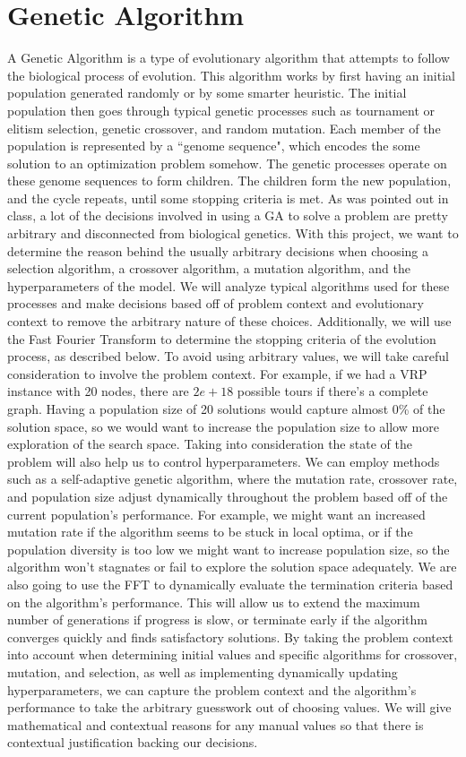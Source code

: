 \documentclass{article}
\renewcommand{\_}{\ifincsname_\else\legacyunderscore\fi}
\begin{document}
\section*{Genetic Algorithm}
A Genetic Algorithm is a type of evolutionary algorithm that attempts to follow the biological process of evolution. This algorithm works by first having an initial population generated randomly or by some smarter heuristic. The initial population then goes through typical genetic processes such as tournament or elitism selection, genetic crossover, and random mutation. Each member of the population is represented by a ``genome sequence", which encodes the some solution to an optimization problem somehow. The genetic processes operate on these genome sequences to form children. The children form the new population, and the cycle repeats, until some stopping criteria is met. As was pointed out in class, a lot of the decisions involved in using a GA to solve a problem are pretty arbitrary and disconnected from biological genetics. With this project, we want to determine the reason behind the usually arbitrary decisions when choosing a selection algorithm, a crossover algorithm, a mutation algorithm, and the hyperparameters of the model. We will analyze typical algorithms used for these processes and make decisions based off of problem context and evolutionary context to remove the arbitrary nature of these choices. Additionally, we will use the Fast Fourier Transform to determine the stopping criteria of the evolution process, as described below. To avoid using arbitrary values, we will take careful consideration to involve the problem context. For example, if we had a VRP instance with 20 nodes, there are $2e+18$ possible tours if there's a complete graph. Having a population size of 20 solutions would capture almost 0\% of the solution space, so we would want to increase the population size to allow more exploration of the search space. Taking into consideration the state of the problem will also help us to control hyperparameters. We can employ methods such as a self-adaptive genetic algorithm, where the mutation rate, crossover rate, and population size adjust dynamically throughout the problem based off of the current population's performance. For example, we might want an increased mutation rate if the algorithm seems to be stuck in local optima, or if the population diversity is too low we might want to increase population size, so the algorithm won't stagnates or fail to explore the solution space adequately. We are also going to use the FFT to dynamically evaluate the termination criteria based on the algorithm's performance. This will allow us to extend the maximum number of generations if progress is slow, or terminate early if the algorithm converges quickly and finds satisfactory solutions. By taking the problem context into account when determining initial values and specific algorithms for crossover, mutation, and selection, as well as implementing dynamically updating hyperparameters, we can capture the problem context and the algorithm's performance to take the arbitrary guesswork out of choosing values. We will give mathematical and contextual reasons for any manual values so that there is contextual justification backing our decisions.  
\end{document}
